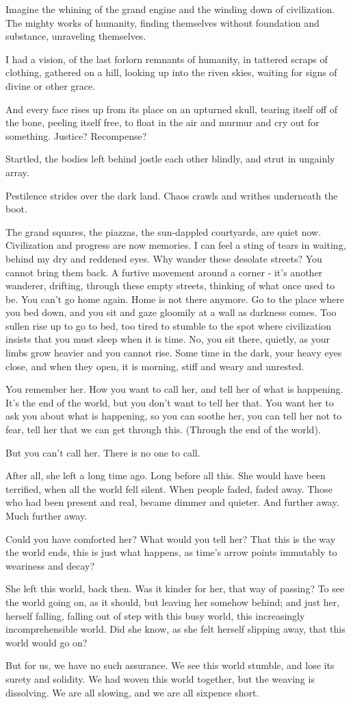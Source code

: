 Imagine the whining of the grand engine and the winding down of
civilization. The mighty works of humanity, finding themselves without
foundation and substance, unraveling themselves.

I had a vision, of the last forlorn remnants of humanity, in tattered
scraps of clothing, gathered on a hill, looking up into the riven skies,
waiting for signs of divine or other grace.

And every face rises up from its place on an upturned skull, tearing
itself off of the bone, peeling itself free, to float in the air and
murmur and cry out for something. Justice? Recompense?

Startled, the bodies left behind jostle each other blindly, and strut in
ungainly array.

Pestilence strides over the dark land. Chaos crawls and writhes
underneath the boot.

The grand squares, the piazzas, the sun-dappled courtyards, are quiet
now. Civilization and progress are now memories. I can feel a sting of
tears in waiting, behind my dry and reddened eyes. Why wander these
desolate streets? You cannot bring them back. A furtive movement around
a corner - it's another wanderer, drifting, through these empty streets,
thinking of what once used to be. You can't go home again. Home is not
there anymore. Go to the place where you bed down, and you sit and gaze
gloomily at a wall as darkness comes. Too sullen rise up to go to bed,
too tired to stumble to the spot where civilization insists that you
must sleep when it is time. No, you sit there, quietly, as your limbs
grow heavier and you cannot rise. Some time in the dark, your heavy eyes
close, and when they open, it is morning, stiff and weary and unrested.

You remember her. How you want to call her, and tell her of what is
happening. It's the end of the world, but you don't want to tell her
that. You want her to ask you about what is happening, so you can soothe
her, you can tell her not to fear, tell her that we can get through
this. (Through the end of the world).

But you can't call her. There is no one to call.

After all, she left a long time ago. Long before all this. She would
have been terrified, when all the world fell silent. When people faded,
faded away. Those who had been present and real, became dimmer and
quieter. And further away. Much further away.

Could you have comforted her? What would you tell her? That this is the
way the world ends, this is just what happens, as time's arrow points
immutably to weariness and decay?

She left this world, back then. Was it kinder for her, that way of
passing? To see the world going on, as it should, but leaving her
somehow behind; and just her, herself falling, falling out of step with
this busy world, this increasingly incomprehensible world. Did she know,
as she felt herself slipping away, that this world would go on?

But for us, we have no such assurance. We see this world stumble, and
lose its surety and solidity. We had woven this world together, but the
weaving is dissolving. We are all slowing, and we are all sixpence
short.
